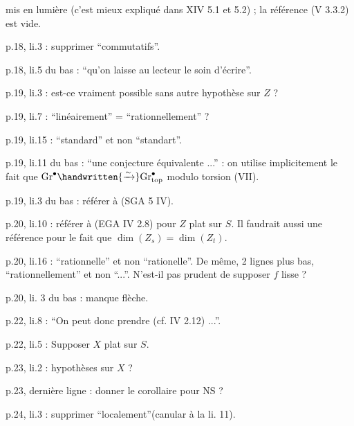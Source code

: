  mis en lumière (c'est mieux expliqué dans XIV 5.1 et 5.2) ; la référence (V 3.3.2) est vide.

p.18, li.3 : supprimer ``commutatifs''.

p.18, li.5 du bas : ``qu'on laisse au lecteur le soin d'écrire''.

p.19, li.3 : est-ce vraiment possible sans autre hypothèse sur $Z$ ?

p.19, li.7 : ``linéairement'' = ``rationnellement'' ?

p.19, li.15 : ``standard'' et non ``standart''.

p.19, li.11 du bas : ``une conjecture équivalente ...'' : on utilise implicitement le fait que $\mathrm{Gr}^{\bullet}\handwritten{\xrightarrow{\sim}}\mathrm{Gr}^{\bullet}_{\mathrm{top}}$ modulo torsion (VII\hspace{2em}).

p.19, li.3 du bas : référer à (SGA 5 IV\hspace{2em}).

p.20, li.10 : référer à (EGA IV 2.8) pour $Z$ plat sur $S$. Il faudrait aussi une référence pour le fait que $\dim(Z_s) = \dim(Z_t)$.

p.20, li.16 : ``rationnelle'' et non ``rationelle''. De même, 2 lignes plus bas, ``rationnellement'' et non ``...''. N'est-il pas prudent de supposer $f$ lisse ?

p.20, li. 3 du bas : manque flèche.

p.22, li.8 : ``On peut donc prendre (cf. IV 2.12) ...''.

p.22, li.5 : Supposer $X$ plat sur $S$.

p.23, li.2 : hypothèses sur $X$ ?

p.23, dernière ligne : donner le corollaire pour $\mathrm{NS}$ ?

\noindent{}p.24, li.3 : supprimer ``localement''(canular à la li. 11).

